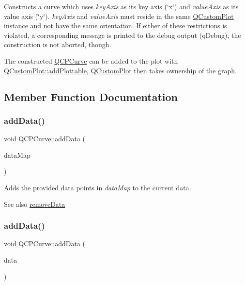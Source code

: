 Constructs a curve which uses {\itshape key\+Axis} as its key axis (\char`\"{}x\char`\"{}) and {\itshape value\+Axis} as its value axis (\char`\"{}y\char`\"{}). {\itshape key\+Axis} and {\itshape value\+Axis} must reside in the same \hyperlink{class_q_custom_plot}{Q\+Custom\+Plot} instance and not have the same orientation. If either of these restrictions is violated, a corresponding message is printed to the debug output (q\+Debug), the construction is not aborted, though.

The constructed \hyperlink{class_q_c_p_curve}{Q\+C\+P\+Curve} can be added to the plot with \hyperlink{class_q_custom_plot_ab7ad9174f701f9c6f64e378df77927a6}{Q\+Custom\+Plot\+::add\+Plottable}, \hyperlink{class_q_custom_plot}{Q\+Custom\+Plot} then takes ownership of the graph. 

\subsection{Member Function Documentation}
\hypertarget{class_q_c_p_curve_a4e24023c3b9ac75440c7a260172c99af}{}\label{class_q_c_p_curve_a4e24023c3b9ac75440c7a260172c99af} 
\subsubsection{\texorpdfstring{add\+Data()}{addData()}\hspace{0.1cm}{\footnotesize\ttfamily [1/5]}}
{\footnotesize\ttfamily void Q\+C\+P\+Curve\+::add\+Data (\begin{DoxyParamCaption}\item[{const \hyperlink{qcustomplot_8h_a444d37ec9cb2951b3a7fe443c34d1658}{Q\+C\+P\+Curve\+Data\+Map} \&}]{data\+Map }\end{DoxyParamCaption})}

Adds the provided data points in {\itshape data\+Map} to the current data. \begin{DoxySeeAlso}{See also}
\hyperlink{class_q_c_p_curve_ad45bb5479be799163028ef2b776f7221}{remove\+Data} 
\end{DoxySeeAlso}
\hypertarget{class_q_c_p_curve_ad304326aba096911f92452d8bfe0470e}{}\label{class_q_c_p_curve_ad304326aba096911f92452d8bfe0470e} 
\subsubsection{\texorpdfstring{add\+Data()}{addData()}\hspace{0.1cm}{\footnotesize\ttfamily [2/5]}}
{\footnotesize\ttfamily void Q\+C\+P\+Curve\+::add\+Data (\begin{DoxyParamCaption}\item[{const \hyperlink{class_q_c_p_curve_data}{Q\+C\+P\+Curve\+Data} \&}]{data }\end{DoxyParamCaption})}

